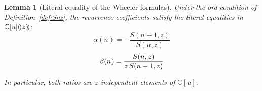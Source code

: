 \documentclass{article}
\newtheorem{lemma}{Lemma}
\newcommand{\C}{\mathbb{C}}
\begin{document}
\begin{lemma}
  [Literal equality of the Wheeler formulas]\label{lem:Wheeler}Under the
  ord-condition of  Definition~\ref{def:Snz}, the recurrence coefficients
  satisfy the literal equalities in $\C [u] (\hspace{-0.17em} (z)
  \hspace{-0.17em})$:
  \begin{equation}
    \alpha (n) = - \frac{S (n + 1, z)}{S (n, z)}
  \end{equation}
  \begin{equation}
    \beta (n) = \frac{S (n, z)}{z \hspace{0.17em} S (n - 1, z)}
    \label{eq:Wheeler}
  \end{equation}
  
  
  In particular, both ratios are $z$-independent elements of $\C [u]$.
\end{lemma}
\end{document}
